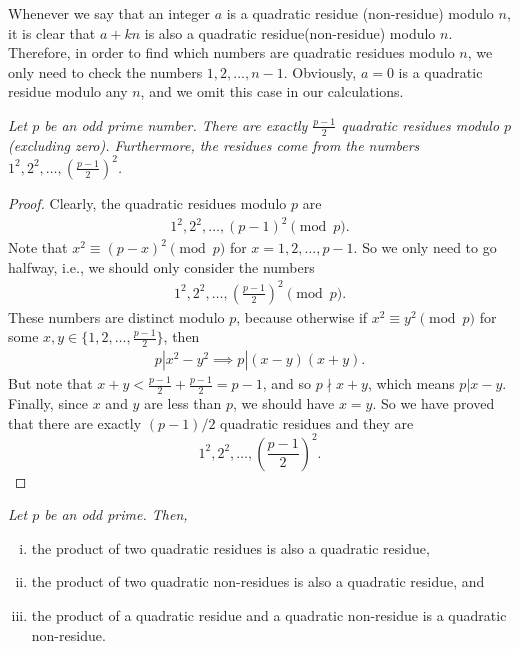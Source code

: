 \documentclass[12pt]{subfile}
\begin{document}
	\begin{note}
		Whenever we say that an integer $a$ is a quadratic residue (non-residue) modulo $n$, it is clear that $a+kn$ is also a quadratic residue(non-residue) modulo $n$. Therefore, in order to find which numbers are quadratic residues modulo $n$, we only need to check the numbers $1, 2, \ldots, n-1$. Obviously, $a=0$ is a quadratic residue modulo any $n$, and we omit this case in our calculations.
	\end{note}
	
	\begin{theorem}\slshape\label{thm:primeresidue}
		Let $p$ be an odd prime number. There are exactly $\displaystyle \frac{p-1}{2}$ quadratic residues modulo $p$ (excluding zero). Furthermore, the residues come from the numbers $1^2, 2^2, \ldots, \displaystyle \left(\frac{p-1}{2}\right)^2$.
	\end{theorem}
	
	\begin{proof}
		Clearly, the quadratic residues modulo $p$ are
		\begin{align*}
			1^2, 2^2, \ldots, (p-1)^2 \pmod p.
		\end{align*}
		Note that $x^2 \equiv (p-x)^2 \pmod p$ for $x=1,2,\ldots,p-1$. So we only need to go halfway, i.e., we should only consider the numbers
		\begin{align*}
			1^2, 2^2, \ldots, \displaystyle \left(\frac{p-1}{2}\right)^2 \pmod p.
		\end{align*}
		These numbers are distinct modulo $p$, because otherwise if $x^2 \equiv y^2 \pmod p$ for some $x,y \in \{1,2,\ldots,\frac{p-1}{2}\}$, then
		\begin{align*}
			p| x^2 -y^2 \implies p|(x-y)(x+y).
		\end{align*}
		But note that $x+y< \frac{p-1}{2}+\frac{p-1}{2}=p-1$, and so $p \nmid x+y$, which means $p|x-y$. Finally, since $x$ and $y$ are less than $p$, we should have $x=y$.
		So we have proved that there are exactly $(p-1)/2$ quadratic residues and they are
		\begin{equation*}
			1^2, 2^2, \ldots, \displaystyle \left(\frac{p-1}{2}\right)^2. 
		\end{equation*}
	\end{proof}
	
	\begin{theorem}\slshape\label{thm:qrnr}
		Let $p$ be an odd prime. Then,
		\begin{enumerate}[(i)]
			\item the product of two quadratic residues is also a quadratic residue,
			\item the product of two quadratic non-residues is also a quadratic residue, and
			\item the product of a quadratic residue and a quadratic non-residue is a quadratic non-residue.
		\end{enumerate}
	\end{theorem}
	
\end{document}

